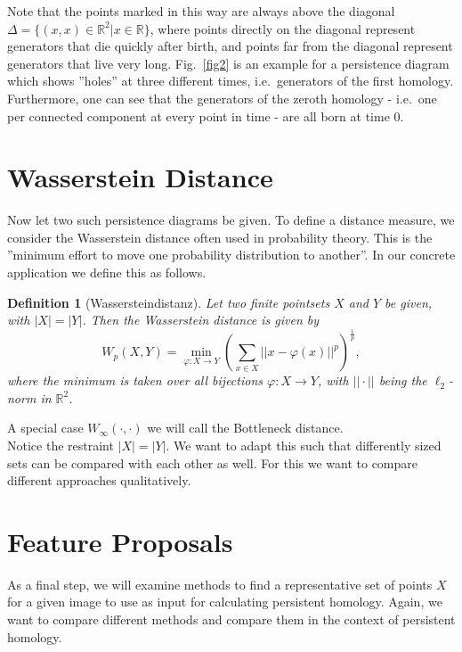 \documentclass[11pt, a4paper,draft]{report}
\newtheorem{definition}{Definition}
\newcommand{\bR}{\mathbb{R}}
\begin{document}
    Note that the points marked in this way are always above the diagonal $\Delta=\{(x,x)\in\bR^2|x\in\bR\}$, where points directly on the diagonal represent generators that die quickly after birth, and points far from the diagonal represent generators that live very long.
    Fig.~\ref{fig2} is an example for a persistence diagram which shows ''holes'' at three different times, i.e.\ generators of the first homology.
    Furthermore, one can see that the generators of the zeroth homology - i.e.\ one per connected component at every point in time - are all born at time 0.\\
    \section{Wasserstein Distance}\label{sec:wasserstein-distance}

    Now let two such persistence diagrams be given.
    To define a distance measure, we consider the Wasserstein distance often used in probability theory.
    This is the ''minimum effort to move one probability distribution to another''.
    In our concrete application we define this as follows.

    \begin{definition}[Wassersteindistanz]
        Let two finite pointsets $X$ and $Y$ be given, with $|X|=|Y|$.
        Then the Wasserstein distance is given by\[W_p(X,Y) = \min_{\varphi:X\rightarrow Y}\left(\sum_{x\in X}||x-\varphi(x)||^p\right)^{\frac{1}{p}},\]
        where the minimum is taken over all bijections $\varphi:X\rightarrow Y$, with $||\cdot||$ being the $\ell_2$-norm in $\bR^2$.
    \end{definition}

    A special case $W_\infty(\cdot,\cdot)$ we will call the Bottleneck distance.\\
    Notice the restraint $|X| = |Y|$.
    We want to adapt this such that differently sized sets can be compared with each other as well.
    For this we want to compare different approaches qualitatively.

    \section{Feature Proposals}\label{sec:feature-proposals}

    As a final step, we will examine methods to find a representative set of points $X$ for a given image to use as input for calculating persistent homology.
    Again, we want to compare different methods and compare them in the context of persistent homology.
\end{document}
